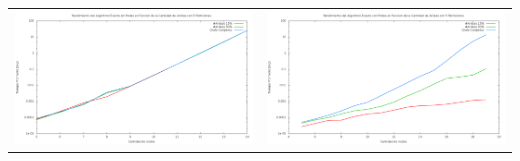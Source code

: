 \bc
\begin{tabular}{l c}
\includegraphics[scale=0.16]{finales/rendimientoExactoSinPoda5Particiones.png}
&
\includegraphics[scale=0.16]{finales/rendimientoExactoConPoda5Particiones.png}
\end{tabular}
\ec

